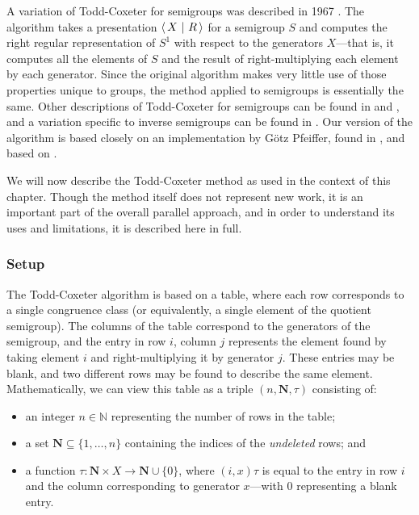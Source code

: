A variation of Todd-Coxeter for semigroups was described in 1967
\cite{neumann_1967}.  The algorithm takes a presentation $\left\langle\,X ~\middle|~ R\,\right\rangle$
for a semigroup $S$ and computes the right regular representation of $S^1$ with
respect to the generators $X$---that is, it computes all the elements of $S$ and
the result of right-multiplying each element by each generator.  Since the
original algorithm makes very little use of those properties unique to groups,
the method applied to semigroups is essentially the same.  Other descriptions of
Todd-Coxeter for semigroups can be found in \cite[Chapter 12]{ruskuc_thesis} and
\cite[Chapter 1.2]{walker_thesis}, and a variation specific to inverse
semigroups can be found in \cite{cutting_thesis}.  Our version of the algorithm
is based closely on an implementation by G\"otz Pfeiffer, found in
\cite[\texttt{lib/tcsemi.gi}]{gap}, and based on \cite{walker_thesis}.

We will now describe the Todd-Coxeter method as used in the context of this
chapter.  Though the method itself does not represent new work, it is an
important part of the overall parallel approach, and in order to understand its
uses and limitations, it is described here in full.

\subsubsection{Setup}

The Todd-Coxeter algorithm is based on a table, where each row corresponds to a
single congruence class (or equivalently, a single element of the quotient
semigroup).  The columns of the table correspond to the generators of the
semigroup, and the entry in row $i$, column $j$ represents the element found by
taking element $i$ and right-multiplying it by generator $j$.  These entries may
be blank, and two different rows may be found to describe the same element.
Mathematically, we can view this table as a triple $(n, \mathbf{N}, \tau)$
consisting of:
\begin{itemize}
\item an integer $n \in \mathbb{N}$ representing the number of rows in the table;
\item a set $\mathbf{N} \subseteq \{1, \ldots, n\}$ containing the indices of the
  \textit{undeleted} rows; and
\item a function $\tau: \mathbf{N} \times X \to \mathbf{N} \cup \{0\}$, where
  $(i, x)\tau$ is equal to the entry in row $i$ and the column corresponding to
  generator $x$---with $0$ representing a blank entry.
\end{itemize}

